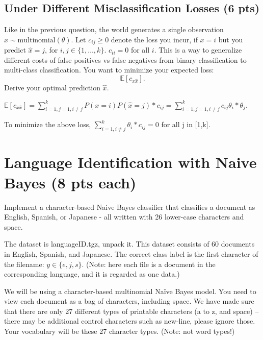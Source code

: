 \documentclass[a4paper]{article}
\theoremstyle{definition}
\def\E{\mathbb E}
\newenvironment{soln}{
    \leavevmode\color{blue}\ignorespaces
}{}
\begin{document}
\subsection{Under Different Misclassification Losses (6 pts)}
Like in the previous question, the world generates a single observation $x \sim \mbox{multinomial}(\theta)$. Let $c_{ij} \ge 0$ denote the loss you incur, if $x=i$ but you predict $\hat x=j$, for $i,j \in \{1, \ldots, k\}$.
$c_{ii}=0$ for all $i$. This is a way to generalize different costs of false positives vs false negatives from binary classification to multi-class classification. You want to minimize your expected loss:
$$\E[c_{x \hat x}].$$
Derive your optimal prediction $\hat x$.\\
\begin{soln}
$\E[c_{x \hat x}]=\sum_{i=1,j=1,i\neq j}^{k} P(x=i)P(\hat{x}=j)*c_{ij}=\sum_{i=1,j=1,i\neq j}^{k} c_{ij}\theta_i*\theta_j$. 

To minimize the above loss, $\sum_{i=1,i\neq j}^k \theta_i*c_{ij}=0$ for all j in [1,k].
    
\end{soln}
\section{Language Identification with Naive Bayes (8 pts each)}
Implement a character-based Naive Bayes classifier that classifies a document as English, Spanish, or Japanese - all written with 26 lower-case characters and space.

The dataset is languageID.tgz, unpack it. This dataset consists of 60 documents in English, Spanish, and Japanese. The correct class label is the first character of the filename: $y \in \{e, j, s\}$. (Note: here each file is a document in the corresponding language, and it is regarded as one data.)

We will be using a character-based multinomial Naïve Bayes model. You need to view each document as a bag of characters, including space. We have made sure that there are only 27 different types of printable characters (a to z, and space) -- there may be additional control characters such as new-line, please ignore those. Your vocabulary will be these 27 character types. (Note: not word types!)
\end{document}
